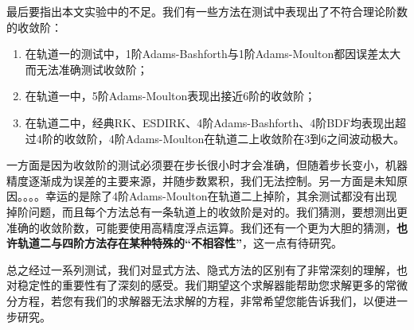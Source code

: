 \documentclass[lang=cn,10pt,bibend=bibtex]{elegantbook}
\begin{document}
最后要指出本文实验中的不足。我们有一些方法在测试中表现出了不符合理论阶数的收敛阶：

\begin{enumerate}[itemindent=1em]
  \item 在轨道一的测试中，1阶Adams-Bashforth与1阶Adams-Moulton都因误差太大而无法准确测试收敛阶；
  \item 在轨道一中，5阶Adams-Moulton表现出接近6阶的收敛阶；
  \item 在轨道二中，经典RK、ESDIRK、4阶Adams-Bashforth、4阶BDF均表现出超过4阶的收敛阶，4阶Adams-Moulton在轨道二上收敛阶在3到6之间波动极大。
\end{enumerate}

一方面是因为收敛阶的测试必须要在步长很小时才会准确，但随着步长变小，机器精度逐渐成为误差的主要来源，并随步数累积，我们无法控制。另一方面是未知原因。。。。幸运的是除了4阶Adams-Moulton在轨道二上掉阶，其余测试都没有出现掉阶问题，而且每个方法总有一条轨道上的收敛阶是对的。我们猜测，要想测出更准确的收敛阶数，可能要使用高精度浮点运算。我们还有一个更为大胆的猜测，\textbf{也许轨道二与四阶方法存在某种特殊的“不相容性”}，这一点有待研究。

总之经过一系列测试，我们对显式方法、隐式方法的区别有了非常深刻的理解，也对稳定性的重要性有了深刻的感受。我们期望这个求解器能帮助您求解更多的常微分方程，若您有我们的求解器无法求解的方程，非常希望您能告诉我们，以便进一步研究。

\printbibliography[heading=bibintoc,title=\ebibname]
\end{document}
